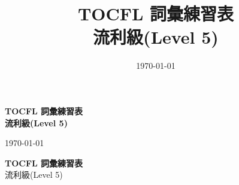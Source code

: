 \documentclass[a4paper,12pt]{ctexart}
\title{\Huge\bfseries TOCFL 詞彙練習表\\[1cm]
{\Large\bfseries 流利級(Level 5)}}
\date{\today}
\author{}
\begin{document}
\begin{titlingpage}
\begin{center}
\vspace*{2cm}
{\Huge\bfseries TOCFL 詞彙練習表}\\[1cm]
{\huge\bfseries 流利級(Level 5)}\\[2cm]

\vfill


\vfill

{\large \today}\\[1cm]
\end{center}
\end{titlingpage}

\begin{center}
{\LARGE\bfseries TOCFL 詞彙練習表} \\
\vspace{0.5cm}
{\Large 流利級(Level 5)}
\end{center}

\end{document}
